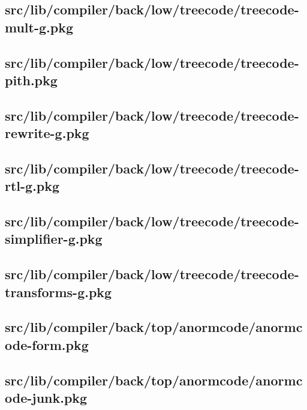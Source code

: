 \subsection{src/lib/compiler/back/low/treecode/treecode-mult-g.pkg}


\subsection{src/lib/compiler/back/low/treecode/treecode-pith.pkg}


\subsection{src/lib/compiler/back/low/treecode/treecode-rewrite-g.pkg}


\subsection{src/lib/compiler/back/low/treecode/treecode-rtl-g.pkg}


\subsection{src/lib/compiler/back/low/treecode/treecode-simplifier-g.pkg}


\subsection{src/lib/compiler/back/low/treecode/treecode-transforms-g.pkg}


\subsection{src/lib/compiler/back/top/anormcode/anormcode-form.pkg}


\subsection{src/lib/compiler/back/top/anormcode/anormcode-junk.pkg}


